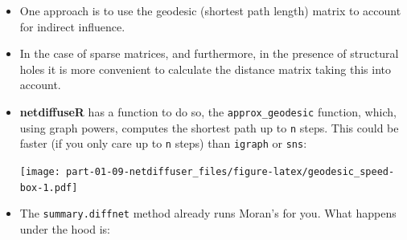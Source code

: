 \documentclass[
]{book}
\newenvironment{Shaded}{\begin{snugshade}}{\end{snugshade}}
\newcommand{\AttributeTok}[1]{\textcolor[rgb]{0.13,0.29,0.53}{#1}}
\newcommand{\CommentTok}[1]{\textcolor[rgb]{0.56,0.35,0.01}{\textit{#1}}}
\newcommand{\DecValTok}[1]{\textcolor[rgb]{0.00,0.00,0.81}{#1}}
\newcommand{\FunctionTok}[1]{\textcolor[rgb]{0.13,0.29,0.53}{\textbf{#1}}}
\newcommand{\NormalTok}[1]{#1}
\newcommand{\OtherTok}[1]{\textcolor[rgb]{0.56,0.35,0.01}{#1}}
\newcommand{\SpecialCharTok}[1]{\textcolor[rgb]{0.81,0.36,0.00}{\textbf{#1}}}
\newcommand{\StringTok}[1]{\textcolor[rgb]{0.31,0.60,0.02}{#1}}
\begin{document}
\begin{itemize}
\item
  One approach is to use the geodesic (shortest path length) matrix to account for indirect
  influence.
\item
  In the case of sparse matrices, and furthermore, in the presence of structural holes
  it is more convenient to calculate the distance matrix taking this into account.
\item
  \textbf{netdiffuseR} has a function to do so, the \texttt{approx\_geodesic} function, which,
  using graph powers, computes the shortest path up to \texttt{n} steps. This could be
  faster (if you only care up to \texttt{n} steps) than \texttt{igraph} or \texttt{sns}:

\begin{Shaded}
\end{Shaded}

  \texttt{[image: part-01-09-netdiffuser\_files/figure-latex/geodesic\_speed-box-1.pdf]}
\item
  The \texttt{summary.diffnet} method already runs Moran's for you. What happens under the hood is:

\begin{Shaded}
\end{Shaded}
\end{itemize}
\end{document}
